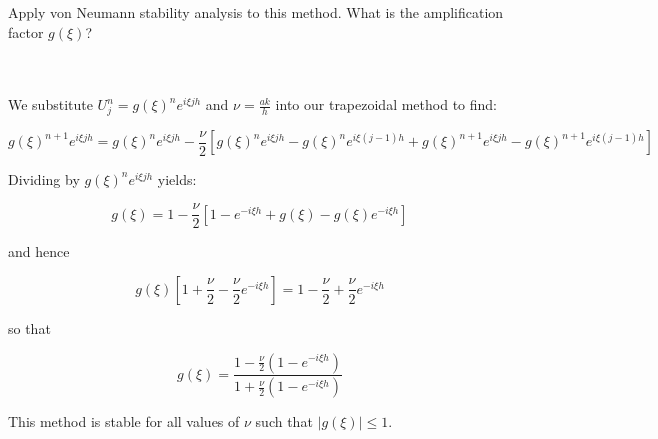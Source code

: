 Apply von Neumann stability analysis to this method. What is the amplification factor $g(\xi)$?

\begin{solution}\ \\\\
    We substitute $U_j^n = g(\xi)^{n} e^{i \xi j h}$ and $\nu = \frac{ak}{h}$ into our trapezoidal method to find:

    $$
    g(\xi)^{n+1} e^{i \xi j h} = g(\xi)^{n} e^{i \xi j h} - \frac{\nu}{2}\left[ g(\xi)^{n} e^{i \xi j h} - g(\xi)^{n} e^{i \xi (j-1) h} + g(\xi)^{n+1} e^{i \xi j h} - g(\xi)^{n+1} e^{i \xi (j-1) h} \right]
    $$ 

    Dividing by $g(\xi)^{n} e^{i \xi j h}$ yields:

    $$
    g(\xi) = 1 - \frac{\nu}{2} \left[1 - e^{-i \xi h} + g(\xi) - g(\xi) e^{-i \xi h}\right]
    $$

    and hence

    $$
    g(\xi) \left[ 1 + \frac{\nu}{2} - \frac{\nu}{2}e^{-i \xi h} \right] = 1 - \frac{\nu}{2} + \frac{\nu}{2}e^{-i \xi h}
    $$

    so that

    $$
    g(\xi) = \frac{1 - \frac{\nu}{2}\left(1 -  e^{-i \xi h} \right)}{1 + \frac{\nu}{2}\left(1 -  e^{-i \xi h} \right)}
    $$

    This method is stable for all values of $\nu$ such that $|g(\xi)| \le 1$.
    \ \\
\end{solution}